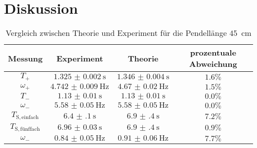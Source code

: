 \section{Diskussion}
\label{sec:Diskussion}

\begin{table}
	\caption{Vergleich zwischen Theorie und Experiment für die Pendellänge 45 \,\si{\centi\meter}}
	\label{tab:discuss}
	\begin{tabular}{cccc}
		\toprule
		Messung                    & Experiment               & Theorie                  & prozentuale Abweichung \\
		\midrule
		$T_{\mathrm{+}}         $  & $\SI{1.325(2)}{\second}$ & $\SI{1.346(4)}{\second}$ & $1.6\%$                \\
		$\omega_{\mathrm{+}}    $  & $\SI{4.742(9)}{\Hz}$     & $\SI{4.67(2)}{\Hz}$      & $1.5\%$                \\
		$T_{\mathrm{-}}         $  & $\SI{1.13(1)}{\second}$  & $\SI{1.13(1)}{\second}$  & $0.0\% $               \\
		$\omega_{\mathrm{-}}    $  & $\SI{5.58(5)}{\Hz}$      & $\SI{5.58(5)}{\Hz}$      & $ 0.0\%$               \\
		$T_{\mathrm{S,einfach}} $  & $\SI{6.4(1)}{\second}$   & $\SI{6.9(4)}{\second}$   & $ 7.2\%$               \\
		$T_{\mathrm{S,fünffach}}$ & $\SI{6.96(3)}{\second}$  & $\SI{6.9(4)}{\second}$   & $ 0.9\%$               \\
		$\omega_{\mathrm{-}}    $  & $\SI{0.84(5)}{\Hz}$      & $\SI{0.91(6)}{\Hz}$      & $ 7.7\%$               \\
		\bottomrule
	\end{tabular}
\end{table}
